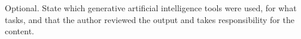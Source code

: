 Optional. State which generative artificial intelligence tools were used, for what tasks, and that the author reviewed the output and takes responsibility for the content.
